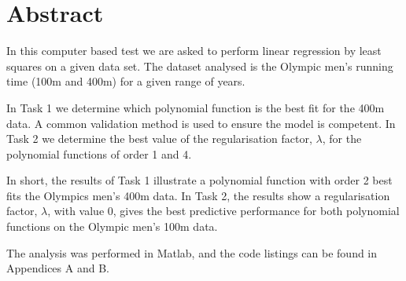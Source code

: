 \section{Abstract}
In this computer based test we are asked to perform linear regression by least squares on a given data set. The dataset analysed is the Olympic men's running time (100m and 400m) for a given range of years. 

In Task 1 we determine which polynomial function is the best fit for the 400m data. A common validation method is used to ensure the model is competent. In Task 2 we determine the best value of the regularisation factor, $\lambda$, for the polynomial functions of order 1 and 4.

In short, the results of Task 1 illustrate a polynomial function with order 2 best fits the Olympics men's 400m data. In Task 2, the results show a regularisation factor, $\lambda$, with value 0, gives the best predictive performance for both polynomial functions on the Olympic men's 100m data.

The analysis was performed in Matlab, and the code listings can be found in Appendices A and B.

